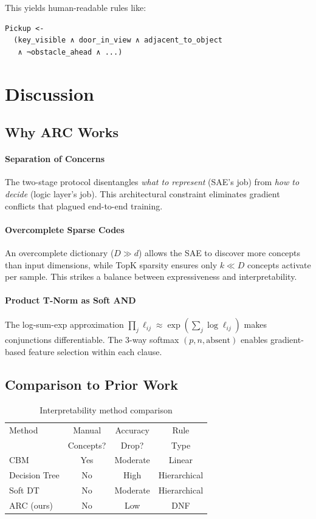 \documentclass[11pt,twocolumn]{article}
\begin{document}
This yields human-readable rules like:
\begin{verbatim}
Pickup <-
  (key_visible ∧ door_in_view ∧ adjacent_to_object
   ∧ ¬obstacle_ahead ∧ ...)
\end{verbatim}

\section{Discussion}

\subsection{Why ARC Works}

\paragraph{Separation of Concerns} The two-stage protocol disentangles \emph{what to represent} (SAE's job) from \emph{how to decide} (logic layer's job). This architectural constraint eliminates gradient conflicts that plagued end-to-end training.

\paragraph{Overcomplete Sparse Codes} An overcomplete dictionary ($D \gg d$) allows the SAE to discover more concepts than input dimensions, while TopK sparsity ensures only $k \ll D$ concepts activate per sample. This strikes a balance between expressiveness and interpretability.

\paragraph{Product T-Norm as Soft AND} The log-sum-exp approximation $\prod_j \ell_{ij} \approx \exp(\sum_j \log \ell_{ij})$ makes conjunctions differentiable. The 3-way softmax $(p, n, \text{absent})$ enables gradient-based feature selection within each clause.

\subsection{Comparison to Prior Work}

\begin{table}[h]
\centering
\caption{Interpretability method comparison}
\small
\begin{tabular}{lccc}
\toprule
Method & Manual & Accuracy & Rule \\
 & Concepts? & Drop? & Type \\
\midrule
CBM \cite{koh2020concept} & Yes & Moderate & Linear \\
Decision Tree & No & High & Hierarchical \\
Soft DT \cite{frosst2017distilling} & No & Moderate & Hierarchical \\
ARC (ours) & No & Low & DNF \\
\bottomrule
\end{tabular}
\end{table}
\end{document}
